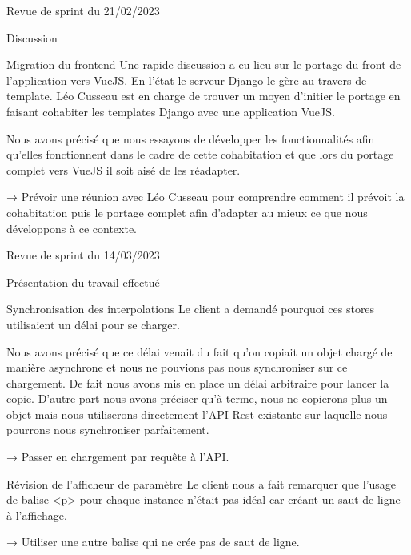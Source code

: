 \documentclass[]{article}
\begin{document}
{\begin{section}{Revue de sprint du 21/02/2023}
 \begin{subsection}{Discussion}
     \begin{subsubsection}{Migration du frontend}
         Une rapide discussion a eu lieu sur le portage du front de l’application vers VueJS. En l’état le serveur Django le gère au travers de template. Léo Cusseau est en charge de trouver un moyen d’initier le portage en faisant cohabiter les templates Django avec une application VueJS.

         Nous avons précisé que nous essayons de développer les fonctionnalités afin qu’elles fonctionnent dans le cadre de cette cohabitation et que lors du portage complet vers VueJS il soit aisé de les réadapter.

         → Prévoir une réunion avec Léo Cusseau pour comprendre comment il prévoit la cohabitation puis le portage complet afin d’adapter au mieux ce que nous développons à ce contexte.
     \end{subsubsection}
 \end{subsection}
\end{section}

\begin{section}{Revue de sprint du 14/03/2023}
 \begin{subsection}{Présentation du travail effectué}
     \begin{subsubsection}{Synchronisation des interpolations}
         Le client a demandé pourquoi ces stores utilisaient un délai pour se charger.

         Nous avons précisé que ce délai venait du fait qu’on copiait un objet chargé de manière asynchrone et nous ne pouvions pas nous synchroniser sur ce chargement. De fait nous avons mis en place un délai arbitraire pour lancer la copie. D’autre part nous avons préciser qu'à terme, nous ne copierons plus un objet mais nous utiliserons directement l’API Rest existante sur laquelle nous pourrons nous synchroniser parfaitement.

         → Passer en chargement par requête à l’API.
     \end{subsubsection}

     \begin{subsubsection}{Révision de l’afficheur de paramètre}
         Le client nous a fait remarquer que l’usage de balise <p> pour chaque instance n’était pas idéal car créant un saut de ligne à l’affichage.

         → Utiliser une autre balise qui ne crée pas de saut de ligne.
     \end{subsubsection}
 \end{subsection}


\end{section}}
\end{document}
